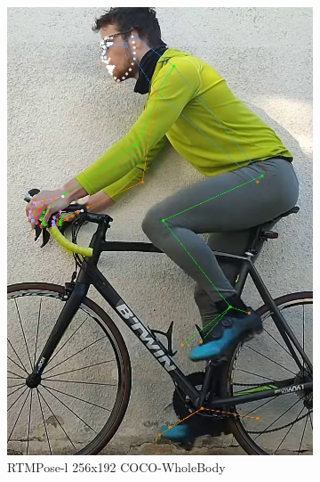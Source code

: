 \begin{figure}[htbp]
\begin{subfigure}[b]{\imgwidth}
        \includegraphics[width=\smallimgwidth]{obrazky-figures/rtmpose-l_8xb64-270e_coco-wholebody-256x192_zlute_196_crop.jpg}
        \caption{RTMPose-l 256x192 COCO-WholeBody}


    \end{subfigure}
    \hfill
    \begin{subfigure}[b]{\imgwidth}
        \centering


\end{subfigure}
\end{figure}
